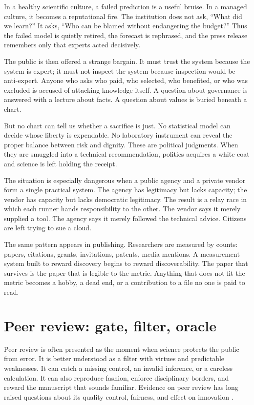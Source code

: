 ﻿\documentclass[12pt,a4paper]{book}
\begin{document}
In a healthy scientific culture, a failed prediction is a useful bruise. In a
managed culture, it becomes a reputational fire. The institution does not ask,
``What did we learn?'' It asks, ``Who can be blamed without endangering the
budget?'' Thus the failed model is quietly retired, the forecast is rephrased,
and the press release remembers only that experts acted decisively.

The public is then offered a strange bargain. It must trust the system because
the system is expert; it must not inspect the system because inspection would
be anti-expert. Anyone who asks who paid, who selected, who benefited, or who
was excluded is accused of attacking knowledge itself. A question about
governance is answered with a lecture about facts. A question about values is
buried beneath a chart.

But no chart can tell us whether a sacrifice is just. No statistical model can
decide whose liberty is expendable. No laboratory instrument can reveal the
proper balance between risk and dignity. These are political judgments. When
they are smuggled into a technical recommendation, politics acquires a white
coat and science is left holding the receipt.

The situation is especially dangerous when a public agency and a private
vendor form a single practical system. The agency has legitimacy but lacks
capacity; the vendor has capacity but lacks democratic legitimacy. The result
is a relay race in which each runner hands responsibility to the other. The
vendor says it merely supplied a tool. The agency says it merely followed the
technical advice. Citizens are left trying to sue a cloud.

The same pattern appears in publishing. Researchers are measured by counts:
papers, citations, grants, invitations, patents, media mentions. A measurement
system built to reward discovery begins to reward discoverability. The paper
that survives is the paper that is legible to the metric. Anything that does
not fit the metric becomes a hobby, a dead end, or a contribution to a file no
one is paid to read.

\section{Peer review: gate, filter, oracle}

Peer review is often presented as the moment when science protects the public
from error. It is better understood as a filter with virtues and predictable
weaknesses. It can catch a missing control, an invalid inference, or a careless
calculation. It can also reproduce fashion, enforce disciplinary borders, and
reward the manuscript that sounds familiar. Evidence on peer review has long
raised questions about its quality control, fairness, and effect on innovation
\cite{1997-armstrong}.
\end{document}
